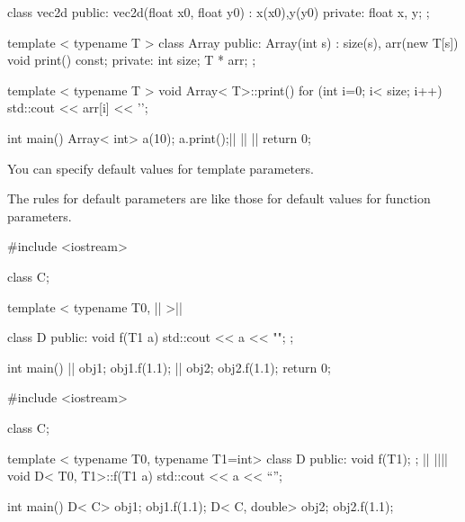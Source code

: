 \begin{consolethree}[escapeinside=||]
class vec2d
{
public:
     vec2d(float x0, float y0)
         : x(x0),y(y0)
     {}
private:
     float x, y;
};

template < typename T >
class Array {
public:
     Array(int s)
         : size(s), arr(new T[s])
     {}
     void print() const;
private:
     int size; T * arr;
};

template < typename T >
void Array< T>::print()
{    
     for (int i=0; i< size; i++)
     std::cout << arr[i] << '\n';
}

int main()
{    
     Array< int> a(10); a.print();||
     ||
     ||
     return 0;
}
 
\end{consolethree}

You can specify default values for template parameters.

The rules for default parameters are like those for default values for
function parameters.

\begin{consolethree}[escapeinside=||]
#include <iostream>

class C{};

template < typename T0, || >||

class D{
public: void f(T1 a) { std::cout << a << "\n"; }
};

int main()
{    
     || obj1; obj1.f(1.1);
     || obj2; obj2.f(1.1);
     return 0;
}
 
\end{consolethree}

\begin{consolethree}[escapeinside=||]
#include <iostream>

class C{};

template < typename T0, typename T1=int>
class D
{
public: void f(T1);
};
||
||||
void D< T0, T1>::f(T1 a)
{    
     std::cout << a << ``\n'';
}

int main()
{   
     D< C> obj1;
     obj1.f(1.1);
     D< C, double> obj2;
     obj2.f(1.1);
} 
\end{consolethree}

